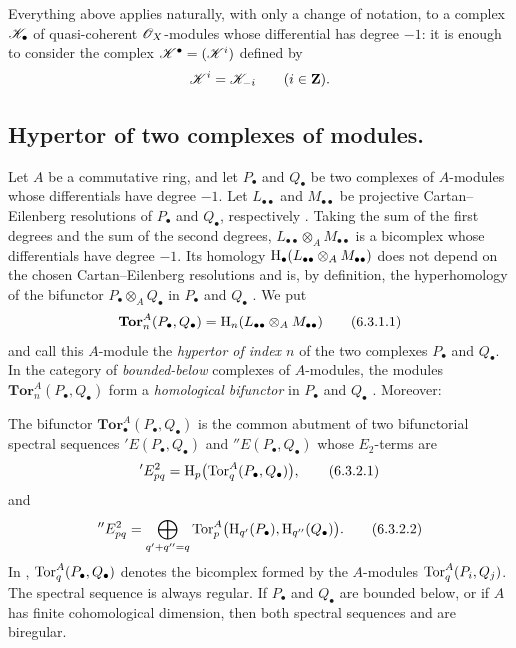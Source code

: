 \begin{env}[6.2.7]
\label{III.6.2.7}
Everything above applies naturally, with only a change of notation,
to a complex $\mathscr{K}_\bullet$ of quasi-coherent
$\mathscr{O}_X$-modules whose differential has degree $-1$: it is
enough to consider the complex
$\mathscr{K}^\bullet=(\mathscr{K}^i)$ defined by
\[
  \mathscr{K}^i=\mathscr{K}_{-i}
  \qquad(i\in\mathbf{Z}).
\]
\end{env}


\subsection{Hypertor of two complexes of modules.}
\label{subsection:III.6.3}

\begin{env}[6.3.1]
\label{III.6.3.1}
Let $A$ be a commutative ring, and let $P_\bullet$ and
$Q_\bullet$ be two complexes of $A$-modules whose differentials
have degree $-1$.  Let $L_{\bullet\bullet}$ and
$M_{\bullet\bullet}$ be projective Cartan--Eilenberg resolutions
of $P_\bullet$ and $Q_\bullet$, respectively
.  Taking the sum of the first degrees and the
sum of the second degrees, $L_{\bullet\bullet}\otimes_A M_{\bullet\bullet}$
is a bicomplex whose differentials have degree $-1$.  Its homology $\mathrm{H}_\bullet(
L_{\bullet\bullet}\otimes_A M_{\bullet\bullet}
)$
does not depend on the chosen Cartan--Eilenberg resolutions and is,
by definition, the hyperhomology of the bifunctor
$P_\bullet\otimes_AQ_\bullet$ in $P_\bullet$ and $Q_\bullet$
.  We put
\[
  \mathbf{Tor}_n^A(P_\bullet,Q_\bullet)
  =
  \mathrm{H}_n(L_{\bullet\bullet}\otimes_A M_{\bullet\bullet})
  \tag{6.3.1.1}\label{III.6.3.1.1}
\]
and call this $A$-module the \emph{hypertor of index $n$} of the
two complexes $P_\bullet$ and $Q_\bullet$.  In the category of
\emph{bounded-below} complexes of $A$-modules, the modules
$\mathbf{Tor}_n^A(P_\bullet,Q_\bullet)$ form a \emph{homological
bifunctor} in $P_\bullet$ and $Q_\bullet$
.  Moreover:
\end{env}

\begin{proposition}[6.3.2]
\label{III.6.3.2}
The bifunctor $\mathbf{Tor}_\bullet^A(P_\bullet,Q_\bullet)$ is the
common abutment of two bifunctorial spectral sequences
$'E(P_\bullet,Q_\bullet)$ and $''E(P_\bullet,Q_\bullet)$ whose
$E_2$-terms are
\[
  'E_{pq}^2
  =
  \mathrm{H}_p\bigl(\operatorname{Tor}_q^A(P_\bullet,Q_\bullet)\bigr),
  \tag{6.3.2.1}\label{III.6.3.2.1}
\]
and
\[
  ''E_{pq}^2
  =
  \bigoplus_{q'+q''=q}
  \operatorname{Tor}_p^A\bigl(
    \mathrm{H}_{q'}(P_\bullet),\mathrm{H}_{q''}(Q_\bullet)
  \bigr).
  \tag{6.3.2.2}\label{III.6.3.2.2}
\]
In ,
$\operatorname{Tor}_q^A(P_\bullet,Q_\bullet)$ denotes the bicomplex formed by
the $A$-modules $\operatorname{Tor}_q^A(P_i,Q_j)$.  The spectral sequence
 is always regular.  If $P_\bullet$ and
$Q_\bullet$ are bounded below, or if $A$ has finite cohomological
dimension, then both spectral sequences
 and  are biregular.
\end{proposition}

